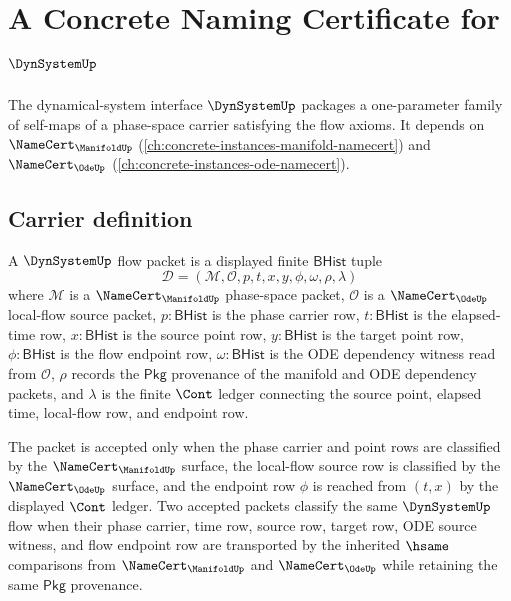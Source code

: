 \chapter{A Concrete Naming Certificate for $\DynSystemUp$}
\label{ch:concrete-instances-dynsystem-namecert}

The dynamical-system interface $\DynSystemUp$ packages a one-parameter family of self-maps of a phase-space carrier satisfying the flow axioms. It depends on $\NameCert_{\ManifoldUp}$ (\autoref{ch:concrete-instances-manifold-namecert}) and $\NameCert_{\OdeUp}$ (\autoref{ch:concrete-instances-ode-namecert}).

\section{Carrier definition}
\label{sec:dynsystem-carrier}

\begin{definition}
\label{def:dynsystem-bhist-flow-carrier}
A $\DynSystemUp$ flow packet is a displayed finite $\mathsf{BHist}$ tuple
$$
\mathcal{D}=(\mathcal{M},\mathcal{O},p,t,x,y,\phi,\omega,\rho,\lambda)
$$
where $\mathcal{M}$ is a $\NameCert_{\ManifoldUp}$ phase-space packet, $\mathcal{O}$ is a $\NameCert_{\OdeUp}$ local-flow source packet, $p:\mathsf{BHist}$ is the phase carrier row, $t:\mathsf{BHist}$ is the elapsed-time row, $x:\mathsf{BHist}$ is the source point row, $y:\mathsf{BHist}$ is the target point row, $\phi:\mathsf{BHist}$ is the flow endpoint row, $\omega:\mathsf{BHist}$ is the ODE dependency witness read from $\mathcal{O}$, $\rho$ records the $\mathsf{Pkg}$ provenance of the manifold and ODE dependency packets, and $\lambda$ is the finite $\Cont$ ledger connecting the source point, elapsed time, local-flow row, and endpoint row.

The packet is accepted only when the phase carrier and point rows are classified by the $\NameCert_{\ManifoldUp}$ surface, the local-flow source row is classified by the $\NameCert_{\OdeUp}$ surface, and the endpoint row $\phi$ is reached from $(t,x)$ by the displayed $\Cont$ ledger. Two accepted packets classify the same $\DynSystemUp$ flow when their phase carrier, time row, source row, target row, ODE source witness, and flow endpoint row are transported by the inherited $\hsame$ comparisons from $\NameCert_{\ManifoldUp}$ and $\NameCert_{\OdeUp}$ while retaining the same $\mathsf{Pkg}$ provenance.
\end{definition}

